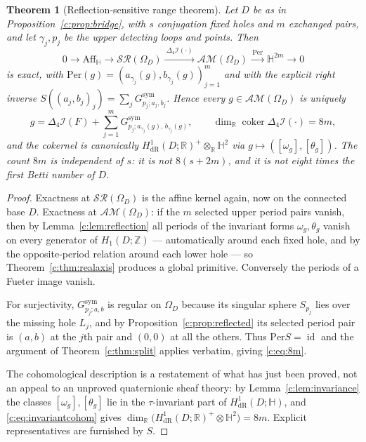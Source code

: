 \documentclass[11pt,a4paper]{article}
\numberwithin{equation}{section}
\newtheorem{theorem}{Theorem}[section]
\theoremstyle{definition}
\theoremstyle{remark}
\theoremstyle{plain}
\newcommand{\HH}{\mathbb H}
\newcommand{\RR}{\mathbb R}
\newcommand{\ZZ}{\mathbb Z}
\newcommand{\lap}{\Delta_4}
\newcommand{\I}{\mathcal I}
\newcommand{\SR}{\mathcal{SR}}
\newcommand{\AM}{\mathcal{AM}}
\newcommand{\Om}{\Omega}
\newcommand{\Aff}{\mathrm{Aff}_{\HH}}
\newcommand{\om}{\omega}
\newcommand{\thet}{\theta}
\newcommand{\Per}{\mathrm{Per}}
\begin{document}
\begin{theorem}[Reflection-sensitive range theorem]
\label{c:thm:reflection-range}
Let $D$ be as in Proposition~\ref{c:prop:bridge}, with $s$ conjugation
fixed holes and $m$ exchanged pairs, and let $\gamma_j,p_j$ be the upper
detecting loops and points.  Then
\begin{equation}
  0\longrightarrow\Aff\longrightarrow\SR(\Om_D)
   \xrightarrow{\ \lap\I(\cdot)\ }\AM(\Om_D)
   \xrightarrow{\ \Per\ }\HH^{2m}\longrightarrow0
  \label{c:eq:exact-sym}
\end{equation}
is exact, with $\Per(g)=(a_{\gamma_j}(g),b_{\gamma_j}(g))_{j=1}^m$ and
with the explicit right inverse
$S((a_j,b_j)_j)=\sum_j G^{\mathrm{sym}}_{p_j;a_j,b_j}$.  Hence every
$g\in\AM(\Om_D)$ is uniquely
\begin{equation}
  g=\lap\I(F)+\sum_{j=1}^{m}G^{\mathrm{sym}}_{p_j;a_{\gamma_j}(g),\,
     b_{\gamma_j}(g)},
  \qquad
  \dim_{\RR}\operatorname{coker}\lap\I(\cdot)=8m,
  \label{c:eq:8m}
\end{equation}
and the cokernel is canonically
$H^1_{\mathrm{dR}}(D;\RR)^{+}\otimes_{\RR}\HH^{2}$
via $g\mapsto([\om_g],[\thet_g])$.  The count $8m$ is independent of
$s$: it is \emph{not} $8(s+2m)$, and it is \emph{not} eight times the
first Betti number of $D$.
\end{theorem}

\begin{proof}
Exactness at $\SR(\Om_D)$ is the affine kernel again, now on the
connected base $D$.  Exactness at $\AM(\Om_D)$: if the $m$ selected upper
period pairs vanish, then by Lemma~\ref{c:lem:reflection} all periods of
the invariant forms $\om_g,\thet_g$ vanish on every generator of
$H_1(D;\ZZ)$ — automatically around each fixed hole, and by the
opposite-period relation around each lower hole — so
Theorem~\ref{c:thm:realaxis} produces a global primitive.  Conversely the
periods of a Fueter image vanish.

For surjectivity, $G^{\mathrm{sym}}_{p_j;a,b}$ is regular on $\Om_D$
because its singular sphere $S_{p_j}$ lies over the missing hole $L_j$,
and by Proposition~\ref{c:prop:reflected} its selected period pair is
$(a,b)$ at the $j$th pair and $(0,0)$ at all the others.  Thus
$\Per S=\operatorname{id}$ and the argument of
Theorem~\ref{c:thm:split} applies verbatim, giving \eqref{c:eq:8m}.

The cohomological description is a restatement of what has just been
proved, not an appeal to an unproved quaternionic sheaf theory: by
Lemma~\ref{c:lem:invariance} the classes $[\om_g],[\thet_g]$ lie in the
$\tau$-invariant part of $H^1_{\mathrm{dR}}(D;\HH)$, and
\eqref{c:eq:invariantcohom} gives
$\dim_\RR\bigl(H^1_{\mathrm{dR}}(D;\RR)^{+}\otimes\HH^2\bigr)=8m$.
Explicit representatives are furnished by $S$.
\end{proof}
\end{document}
